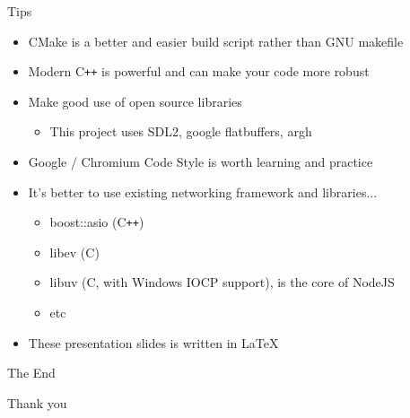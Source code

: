 \documentclass{beamer}
\newcommand{\cpp}{C\texttt{++}}
\begin{document}
\begin{frame}{Tips}
  \begin{itemize}
  \item
    \alert{CMake} is a better and easier build script rather than GNU makefile
  \item
    \alert{Modern \cpp} is powerful and can make your code more robust
  \item
    Make good use of \alert{open source libraries}
    \begin{itemize}
      \item This project uses SDL2, google flatbuffers, argh
    \end{itemize}
  \item
    Google / Chromium Code Style is worth learning and practice
  \end{itemize}

  \begin{itemize}
  \item
    It's better to use existing networking framework and libraries...
    \begin{itemize}
    \item
      boost::asio (\cpp)
    \item
      libev (C)
    \item
      libuv (C, with Windows IOCP support), is the core of NodeJS
    \item
      etc
  \end{itemize}
  \item
    These presentation slides is written in \alert{\LaTeX}
\end{itemize}
\end{frame}


\begin{frame}
\Huge{\centerline{The End}}
\Huge{\centerline{ }}
\large{\centerline{Thank you}}
\end{frame}
\end{document}
